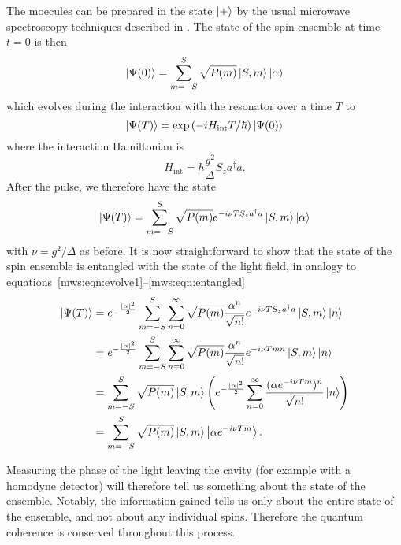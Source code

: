 The moecules can be prepared in the state $\ket{+}$ by the usual microwave
spectroscopy techniques described in . The
state of the spin ensemble at time $t=0$ is then
%
\begin{equation}
  \ket{\Psi(0)} = \sum_{m=-S}^S \sqrt{P(m)} \ket{S, m}\ket{\alpha}
\end{equation}
%
which evolves during the interaction with the resonator over a time $T$ to
%
\begin{equation}
  \ket{\Psi(T)} = \exp\left(-iH_\text{int}T/\hbar\right)\ket{\Psi(0)}
\end{equation}
%
where the interaction Hamiltonian is
%
\begin{equation}
  H_\text{int} = \hbar \frac{g^2}{\Delta} S_z a^\dagger a.
\end{equation}
%
After the pulse, we therefore have the state
%
\begin{equation}
  \ket{\Psi(T)} = \sum_{m=-S}^S \sqrt{P(m)} e^{-i\nu T S_z
  a^\dagger a} \ket{S, m}\ket{\alpha}
\end{equation}
%
with $\nu = g^2/\Delta$ as before. It is now straightforward to show that
the state of the spin ensemble is entangled with the state of the light field,
in analogy to equations~\ref{mws:eqn:evolve1}--\ref{mws:eqn:entangled}
%
\begin{align}
  \ket{\Psi(T)} &= e^{-\frac{|\alpha|^2}{2}}\sum_{m=-S}^S \sum_{n=0}^\infty \sqrt{P(m)}
   \frac{\alpha^n}{\sqrt{n!}} e^{-i\nu T S_z a^\dagger a} \ket{S, m} \ket{n}
   \\
  &= e^{-\frac{|\alpha|^2}{2}}\sum_{m=-S}^S \sum_{n=0}^\infty \sqrt{P(m)}
  \frac{\alpha^n}{\sqrt{n!}} e^{-i\nu Tm n} \ket{S, m} \ket{n} \\
  &= \sum_{m=-S}^S \sqrt{P(m)} \ket{S, m} \left( e^{-\frac{|\alpha|^2}{2}}
  \sum_{n=0}^\infty \frac{(\alpha e^{-i\nu T m})^n}{\sqrt{n!}}\ket{n}\right)
  \\
  &= \sum_{m=-S}^S \sqrt{P(m)} \ket{S, m}\ket{\alpha e^{-i\nu T m}}.
\end{align}

Measuring the phase of the light leaving the cavity (for example with a
homodyne detector) will therefore tell us something about the state of the
ensemble. Notably, the information gained tells us only about the entire state
of the ensemble, and not about any individual spins. Therefore the quantum
coherence is conserved throughout this process.

